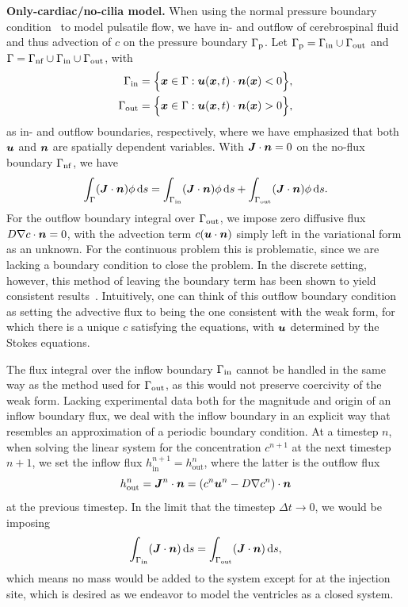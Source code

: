 \documentclass{WileyMSP-template}
\begin{document}
\textbf{Only-cardiac/no-cilia model.} When using the normal pressure
boundary condition~ to model pulsatile flow,
we have in- and outflow of cerebrospinal fluid and thus advection of
$c$ on the pressure boundary $\Gamma_{\mathrm{p}}$.
Let $\Gamma_{\mathrm{p}}=\Gamma_{\mathrm{in}}\cup\Gamma_{\mathrm{out}}$ and $\Gamma = \Gamma_{\mathrm{nf}}\cup\Gamma_{\mathrm{in}}\cup\Gamma_{\mathrm{out}}$, with 
\begin{align*}
    \Gamma_{\mathrm{in}}  &= \Big\{\bm{x}\in\Gamma : \bm{u}(\bm{x}, t)\cdot\bm{n}(\bm{x}) < 0 \Big\}, \\
    \Gamma_{\mathrm{out}} &= \Big\{\bm{x}\in\Gamma : \bm{u}(\bm{x}, t)\cdot\bm{n}(\bm{x}) > 0 \Big\},
\end{align*}
as in- and outflow boundaries, respectively, where we have emphasized that
both $\bm{u}$ and $\bm{n}$ are spatially dependent variables.
With $\bm{J}\cdot\bm{n}=0$ on the no-flux boundary $\Gamma_{\mathrm{nf}}$, we have
\begin{equation*}
    \int_{\Gamma}(\bm{J}\cdot\bm{n})\phi \, \mathrm ds = \int_{\Gamma_{\mathrm{in}}}(\bm{J}\cdot\bm{n})\phi \, \mathrm ds + \int_{\Gamma_{\mathrm{out}}}(\bm{J}\cdot\bm{n})\phi \, \mathrm ds. 
\end{equation*}
For the outflow boundary integral over $\Gamma_{\mathrm{out}}$, we impose zero
diffusive flux $D\nabla c\cdot\bm{n}=0$,
with the advection term $c(\bm{u}\cdot\bm{n})$ simply left in the variational form as an unknown.
For the continuous problem this is problematic, since we are lacking a boundary
condition to close the problem. 
In the discrete setting, however, this method of leaving the boundary term has been shown
to yield consistent results~\cite{Papanastasiou1992ACondition, Lynch2020NumericalHemodynamics,
Griffiths1997TheCondition}. Intuitively, one can think of this outflow boundary condition as
setting the advective flux to being the one consistent with the weak form,
for which there is a unique $c$ satisfying the equations, with $\bm{u}$ determined by
the Stokes equations. 

The flux integral over the inflow boundary $\Gamma_{\mathrm{in}}$ cannot be handled
in the same way as the method used for $\Gamma_{\mathrm{out}}$, as this would not preserve
coercivity of the weak form. Lacking experimental data both for the magnitude and
origin of an inflow boundary flux, we deal with the inflow boundary in an explicit
way that resembles an approximation of a periodic boundary condition. At a timestep $n$,
when solving the linear system for the concentration $c^{n+1}$ at the next timestep $n+1$,
we set the inflow flux $h_{\mathrm{in}}^{n+1} = h_{\mathrm{out}}^{n}$, where the
latter is the outflow flux
\begin{equation*}
    h_{\mathrm{out}}^{n} = \bm{J}^n\cdot\bm{n} = (c^n\bm{u}^n - D\nabla c^n)\cdot\bm{n}
\end{equation*}
at the previous timestep. In the limit that the timestep $\Delta t\to 0$, we would be imposing
\begin{equation*}
    \int_{\Gamma_{\mathrm{in}}}(\bm{J}\cdot\bm{n}) \, \mathrm ds = \int_{\Gamma_{\mathrm{out}}}(\bm{J}\cdot\bm{n}) \, \mathrm ds,
\end{equation*}
which means no mass would be added to the system except for at the injection site,
which is desired as we endeavor to model the ventricles as a closed system.
\end{document}
